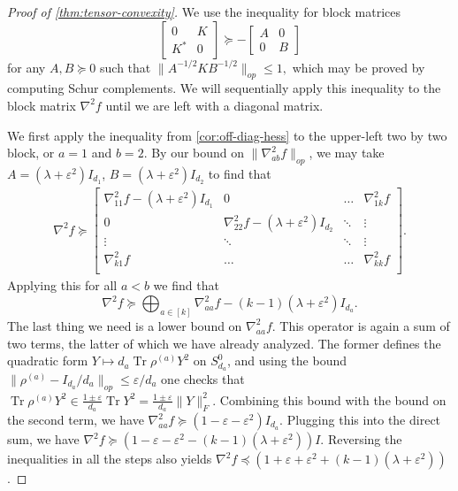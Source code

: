 \documentclass{article}
\newcommand\eps{\varepsilon}
\newcommand\smallSym{S}
\newcommand\tr{\operatorname{Tr}}
\newcommand{\CF}[1]{{\color{purple}[CF: #1]}}
\begin{document}
\begin{proof}[Proof of \cref{thm:tensor-convexity}] 
We use the inequality for block matrices 
$$\begin{bmatrix} 0 & K \\ K^{*} & 0 \end{bmatrix} \succeq - \begin{bmatrix} A & 0 \\ 0 & B \end{bmatrix}$$ for any $A,B \succeq 0$ such that $\|A^{-1/2} K B^{-1/2}\|_{op} \leq 1,$ which may be proved by computing Schur complements. We will sequentially apply this inequality to the block matrix $\nabla^2 f$ until we are left with a diagonal matrix. 

We first apply the inequality from \cref{cor:off-diag-hess} to the upper-left two by two block, or $a = 1$ and $b = 2$. By our bound on $\|\nabla^2_{ab} f\|_{op}$, we may take 
   $A = (\lambda + \eps^2) I_{d_1}$, $B = (\lambda + \eps^2)I_{d_2}$ to find that 
   \begin{align*}
\nabla^2 f \succeq \begin{bmatrix}
 \nabla^2_{11} f - (\lambda + \eps^2) I_{d_1} & 0 & \hdots &  \nabla^2_{1k} f \\
0 & \nabla^2_{22} f - (\lambda + \eps^2) I_{d_2} & \ddots & \vdots \\
\vdots & \ddots & \ddots & \vdots\\
\nabla^2_{k1}f & \hdots &  \hdots & \nabla^2_{kk} f \\
  \end{bmatrix}.\end{align*}
 Applying this for all $a < b$ we find that 
 $$\nabla^2 f  \succeq \bigoplus_{a \in [k]} \nabla^2_{aa} f - (k - 1) (\lambda + \eps^2) I_{d_a}.$$ 
The last thing we need is a lower bound on $\nabla^2_{aa} f.$ This operator is again a sum of two terms, the latter of which we have already analyzed. The former defines the quadratic form $Y \mapsto d_a \tr \rho^{(a)} Y^2$ on $\smallSym^0_{d_a}$, and using the bound $\|\rho^{(a)} - I_{d_a}/{d_a}\|_{op} \leq \eps/d_a$ one checks that $\tr \rho^{(a)} Y^2 \in \frac{1 \pm \eps }{d_a} \tr Y^2 = \frac{1 \pm \eps }{d_a} \|Y\|_{F}^2. $ Combining this bound with the bound on the second term, we have $\nabla^2_{aa} f \succeq (1 -  \eps  - \eps^2 ) I_{d_a}$. Plugging this into the direct sum, we have $\nabla^2 f \succeq (1  - \eps - \eps^2  - (k - 1) (\lambda + \eps^2)) I$. Reversing the inequalities in all the steps also yields $\nabla^2 f \preceq (1  + \eps + \eps^2  + (k - 1) (\lambda + \eps^2))$.
\end{proof}
\end{document}
